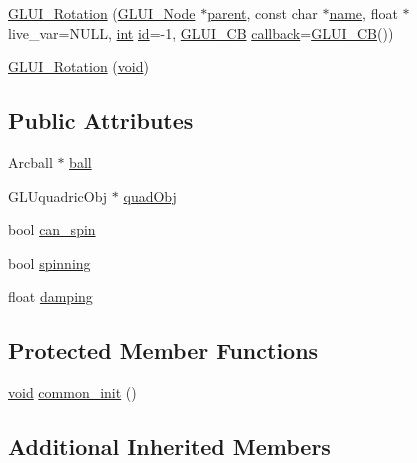 \begin{DoxyCompactItemize}
\item 
\hyperlink{class_g_l_u_i___rotation_a09fc7b3a09cbe61a5ef58d970f86adfe}{G\+L\+U\+I\+\_\+\+Rotation} (\hyperlink{class_g_l_u_i___node}{G\+L\+U\+I\+\_\+\+Node} $\ast$\hyperlink{class_g_l_u_i___node_a8ed65d447784f6f88bd3e2e2bcac6cdb}{parent}, const char $\ast$\hyperlink{glext_8h_ad977737dfc9a274a62741b9500c49a32}{name}, float $\ast$live\+\_\+var=N\+U\+L\+L, \hyperlink{wglext_8h_a500a82aecba06f4550f6849b8099ca21}{int} \hyperlink{glext_8h_a58c2a664503e14ffb8f21012aabff3e9}{id}=-\/1, \hyperlink{class_g_l_u_i___c_b}{G\+L\+U\+I\+\_\+\+C\+B} \hyperlink{class_g_l_u_i___control_a96060fe0cc6d537e736dd6eef78e24ab}{callback}=\hyperlink{class_g_l_u_i___c_b}{G\+L\+U\+I\+\_\+\+C\+B}())
\item 
\hyperlink{class_g_l_u_i___rotation_a4cec5398179283c77727f7d4d78f0f92}{G\+L\+U\+I\+\_\+\+Rotation} (\hyperlink{wglext_8h_a9e6b7f1933461ef318bb000d6bd13b83}{void})
\end{DoxyCompactItemize}
\subsection*{Public Attributes}
\begin{DoxyCompactItemize}
\item 
Arcball $\ast$ \hyperlink{class_g_l_u_i___rotation_ae57cc59ce48aec071b5db4fe608b98b3}{ball}
\item 
G\+L\+Uquadric\+Obj $\ast$ \hyperlink{class_g_l_u_i___rotation_af98f7b7cec5463b46b3ba1f685ef142c}{quad\+Obj}
\item 
bool \hyperlink{class_g_l_u_i___rotation_abb7e1e037705d27ac91805ac21ddbd39}{can\+\_\+spin}
\item 
bool \hyperlink{class_g_l_u_i___rotation_a49f0172a0fe24adb308730664f083018}{spinning}
\item 
float \hyperlink{class_g_l_u_i___rotation_a3164bbd01acc6e91b845c72df6987a51}{damping}
\end{DoxyCompactItemize}
\subsection*{Protected Member Functions}
\begin{DoxyCompactItemize}
\item 
\hyperlink{wglext_8h_a9e6b7f1933461ef318bb000d6bd13b83}{void} \hyperlink{class_g_l_u_i___rotation_af6715a13b59b945ea1635a01a0a62aa6}{common\+\_\+init} ()
\end{DoxyCompactItemize}
\subsection*{Additional Inherited Members}



